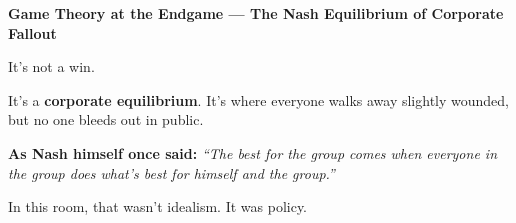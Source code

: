 \begin{TechnicalSidebar}{\textbf{Game Theory at the Endgame --- The Nash Equilibrium of Corporate Fallout}}
    \medskip
    
    It’s not a win.

    \medskip
    
    It’s a \textbf{corporate equilibrium}. It's  
    where everyone walks away slightly wounded,  
    but no one bleeds out in public.
    
    \medskip
    
    \textbf{As Nash himself once said:}  
    \textit{“The best for the group comes when everyone in the group does what’s best for 
    himself and the group.”}
    
    \medskip
    
    In this room,  
    that wasn’t idealism.  
    It was policy.
    
\end{TechnicalSidebar}
